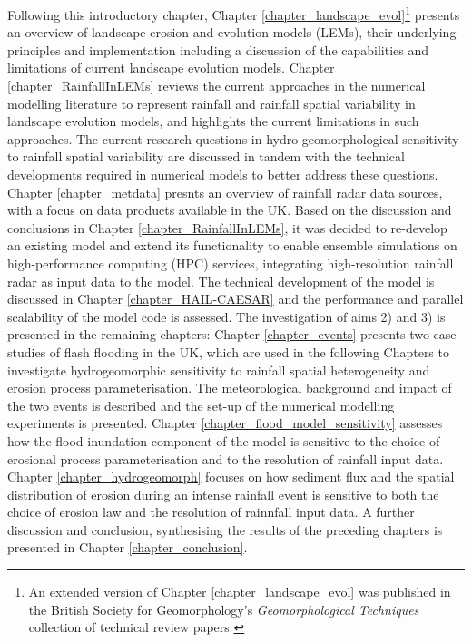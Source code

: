 Following this introductory chapter, Chapter \ref{chapter_landscape_evol}\footnote{An extended version of Chapter \ref{chapter_landscape_evol} was published in the British Society for Geomorphology's \textit{Geomorphological Techniques} collection of technical review papers \citep{valters2016modelling}} presents an overview of landscape erosion and evolution models (LEMs), their underlying principles and implementation including a discussion of the capabilities and limitations of current landscape evolution models. Chapter \ref{chapter_RainfallInLEMs} reviews the current approaches in the numerical modelling literature to represent rainfall and rainfall spatial variability in landscape evolution models, and highlights the current limitations in such approaches. The current research questions in hydro-geomorphological sensitivity to rainfall spatial variability are discussed in tandem with the technical developments required in numerical models to better address these questions. Chapter \ref{chapter_metdata} presnts an overview of rainfall radar data sources, with a focus on data products available in the UK. Based on the discussion and conclusions in Chapter \ref{chapter_RainfallInLEMs}, it was decided to re-develop an existing model and extend its functionality to enable ensemble simulations on high-performance computing (HPC) services, integrating high-resolution rainfall radar as input data to the model. The technical development of the model is discussed in Chapter \ref{chapter_HAIL-CAESAR} and the performance and parallel scalability of the model code is assessed. The investigation of aims 2) and 3) is presented in the remaining chapters: Chapter \ref{chapter_events} presents two case studies of flash flooding in the UK, which are used in the following Chapters to investigate hydrogeomorphic sensitivity to rainfall spatial heterogeneity and erosion process parameterisation. The meteorological background and impact of
the two events is described and the set-up of the numerical modelling experiments is presented. Chapter \ref{chapter_flood_model_sensitivity} assesses how the flood-inundation component of the model is sensitive to the choice of erosional process parameterisation and to the resolution of rainfall input data. Chapter \ref{chapter_hydrogeomorph} focuses on how sediment flux and the spatial distribution of erosion during an intense rainfall event is sensitive to both the choice of erosion law and the resolution of rainnfall input data. A further discussion and conclusion, synthesising the results of the preceding chapters is presented in Chapter \ref{chapter_conclusion}.

